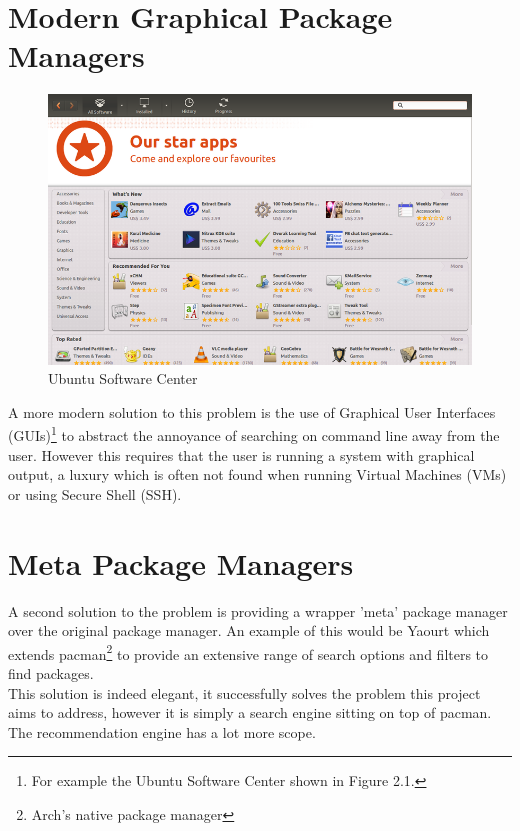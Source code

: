 \documentclass{l4proj}
\begin{document}
\section{Modern Graphical Package Managers}
\begin{figure}
\centerline{\includegraphics[scale=0.5]{images/ubuntu_software.png}}
\caption{Ubuntu Software Center}
\end{figure}
A more modern solution to this problem is the use of Graphical User Interfaces (GUIs)\footnote{For example the Ubuntu Software Center shown in Figure 2.1.} to abstract the annoyance of searching on command line away from the user. However this requires that the user is running a system with graphical output, a luxury which is often not found when running Virtual Machines (VMs) or using Secure Shell (SSH).

\section{Meta Package Managers}
A second solution to the problem is providing a wrapper 'meta' package manager over the original package manager. An example of this would be Yaourt\cite{yaourt} which extends pacman\footnote{Arch's native package manager} to provide an extensive range of search options and filters to find packages.\\
This solution is indeed elegant, it successfully solves the problem this project aims to address, however it is simply a search engine sitting on top of pacman. The recommendation engine has a lot more scope.
\end{document}
